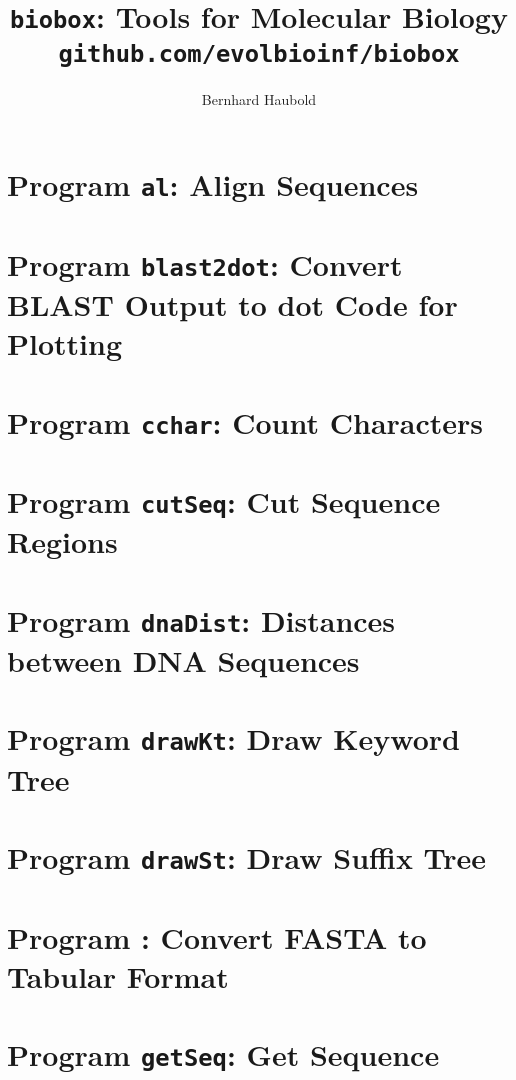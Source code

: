 \documentclass[a4paper]{report}
\begin{document}
\pagestyle{noweb}

\title{\texttt{biobox}: Tools for Molecular Biology\\
\small\texttt{github.com/evolbioinf/biobox}}
\author{Bernhard Haubold}
\maketitle
\tableofcontents

\chapter{Program \texttt{al}: Align Sequences}\label{ch:al}

\chapter{Program \texttt{blast2dot}: Convert BLAST Output to dot Code
  for Plotting}\label{ch:b2d}

\chapter{Program \texttt{cchar}: Count Characters}\label{ch:cch}

\chapter{Program \texttt{cutSeq}: Cut Sequence Regions}\label{ch:cut}

\chapter{Program \texttt{dnaDist}: Distances between DNA Sequences}\label{ch:dna}

\chapter{Program \texttt{drawKt}: Draw Keyword Tree}\label{ch:dkt}

\chapter{Program \texttt{drawSt}: Draw Suffix Tree}\label{ch:dst}

\chapter{Program : Convert FASTA to Tabular
  Format}\label{ch:f2t}

\chapter{Program \texttt{getSeq}: Get Sequence}\label{ch:get}

\end{document}
